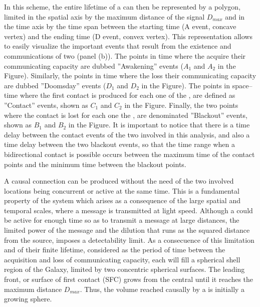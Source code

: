  

In this scheme, the entire lifetime of a \ceti{} can then be represented
by a polygon, limited in the spatial axis by the maximum distance of
the signal $D_{max}$ and in the time axis by the time span between the
starting time (A event, concave vertex) and the ending time (D event, 
convex vertex).
%
This representation allows to easily visualize the important events
that result from the existence and communications of two \cetis{} (panel
(b)).
%
The points in time where the \cetis{} acquire their communicating capacity
are dubbed ''Awakening'' events ($A_1$ and $A_2$ in the Figure).
%
Similarly, the points in time where the \cetis{} loss their
communicating capacity are dubbed ''Doomsday'' events ($D_1$ and $D_2$
in the Figure).
%
The points in space--time where the first contact is produced for each
one of the \cetis{}, are defined as ''Contact'' events, shown as $C_1$
and $C_2$ in the Figure.
%
Finally, the two points where the contact is lost for each one the
\cetis{}, are denominated ''Blackout'' events, shown as $B_1$ and $B_2$
in the Figure.
%
It is important to notice that there is a time delay between the
contact events of the two \cetis{} involved in this analysis, and also a
time delay between the two blackout events, so that the time range
when a bidirectional contact is possible occurs between the maximum
time of the contact points and the minimum time between the blackout
points.   
 

A causal connection can be produced without the need of the two
involved locations being concurrent or active at the same time.
%
This is a fundamental property of the system which arises as a
consequence of the large spatial and temporal scales, where a message
is transmitted at light speed.
%
Although a \ceti{} could be active for enough time so as to transmit a
message at large distances, the limited power of the message and the
dilution that runs as the squared distance from the source, imposes a
detectability limit.
%
As a consecuence of this limitation and of their finite lifetime,
considered as the period of time between the acquisition and loss of
communicating capacity, each \ceti{} will fill a spherical shell region of
the Galaxy, limited by two concentric spherical surfaces.
%
The leading front, or surface of first contact (SFC) grows from the
central \ceti{} until it reaches the maximum distance $D_{max}$.
%
Thus, the volume reached causally by a \ceti{} is initially a growing
sphere.
   
      




